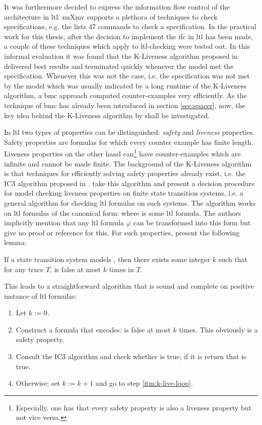 It was furthermore decided to express the information flow control of the architecture in \gls{ltl}.
nuXmv supports a plethora of techniques to check specifications, e.g. the  \cite{nuXmv} lists 47 commands to check a specification.
In the practical work for this thesis, after the decision to implement the \gls{ifc} in \gls{ltl} has been made, a couple of these techniques which apply to \gls{ltl}-checking were tested out.
In this informal evaluation it was found that the K-Liveness algorithm proposed in \cite{Claessen12} delivered best results and terminated quickly whenever the model met the specification.
Whenever this was not the case, i.e. the specification was not met by the model which was usually indicated by a long runtime of the K-Liveness algorithm, a \gls{bmc} approach computed counter-examples very efficiently.
As the technique of \gls{bmc} has already been introduced in section \ref{sec:spacer}, now, the key idea behind the K-Liveness algorithm by \citeauthor{Claessen12} shall be investigated.

In \gls{ltl} two types of properties can be distinguished: \textit{safety} and \textit{liveness} properties.
Safety properties are formulas for which every counter example has finite length.
Liveness properties on the other hand can\footnote{%
    Especially, one has that every safety property is also a liveness property but not vice versa.
} have counter-examples which are infinite and cannot be made finite.
The background of the K-Liveness algorithm is that techniques for efficiently solving safety properties already exist, i.e. the IC3 algorithm proposed in \cite{Bradley11}.
\citeauthor{Claessen12} take this algorithm and present a decision procedure for model checking liveness properties on finite state transition systems, i.e. a general algorithm for checking \gls{ltl} formulas on such systems.
The algorithm works on \gls{ltl} formulas of the canonical form:  where  is some \gls{ltl} formula.
The authors implicitly mention that any \gls{ltl} formula $ \varphi $ can be transformed into this form but give no proof or reference for this.
For such properties, \citeauthor{Claessen12} present the following lemma:
\begin{lemma}
    If a state transition system models , then there exists some integer $ k $ such that for any trace $ T $,  is false at most $ k $ times in $ T $.
\end{lemma}
This leads to a straightforward algorithm that is sound and complete on positive instance of \gls{ltl} formulas:
\begin{enumerate}
    \item Let $ k := 0 $.
    \item Construct a formula  that encodes:  is false at most $ k $ times. \label{itm:k-live-loop}
    This obviously is a safety property.
    \item Consult the IC3 algorithm and check whether  is true; if it is return that  is true.
    \item Otherwise; set $ k := k + 1 $ and go to step \ref{itm:k-live-loop}.
\end{enumerate}

